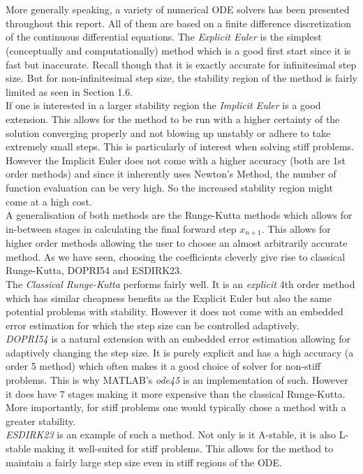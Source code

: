 

\\\

More generally speaking, a variety of numerical ODE solvers has been presented throughout this report. All of them are based on a finite difference discretization of the continuous differential equations. The \textit{Explicit Euler} is the simplest (conceptually and computationally) method which is a good first start since it is fast but inaccurate. Recall though that it is exactly accurate for infinitesimal step size. But for non-infinitesimal step size, the stability region of the method is fairly limited as seen in Section 1.6. \\
If one is interested in a larger stability region the \textit{Implicit Euler} is a good extension. This allows for the method to be run with a higher certainty of the solution converging properly and not blowing up unstably or adhere to take extremely small steps. This is particularly of interest when solving stiff problems. However the Implicit Euler does not come with a higher accuracy (both are 1st order methods) and since it inherently uses Newton's Method, the number of function evaluation can be very high. So the increased stability region might come at a high cost.
\\
A generalisation of both methods are the Runge-Kutta methods which allows for in-between stages in calculating the final forward step $x_{n+1}$. This allows for higher order methods allowing the user to choose an almost arbitrarily accurate method. As we have seen, choosing the coefficients cleverly give rise to classical Runge-Kutta, DOPRI54 and ESDIRK23.
\\
The \textit{Classical Runge-Kutta} performs fairly well. It is an \textit{explicit} 4th order method which has similar cheapness benefits as the Explicit Euler but also the same potential problems with stability. However it does not come with an embedded error estimation for which the step size can be controlled adaptively.\\
\textit{DOPRI54} is a natural extension with an embedded error estimation allowing for adaptively changing the step size. It is purely explicit and has a high accuracy (a order 5 method) which often makes it a good choice of solver for non-stiff problems. This is why MATLAB's \textit{ode45} is an implementation of such. However it does have 7 stages making it more expensive than the classical Runge-Kutta. More importantly, for stiff problems one would typically chose a method with a greater stability.\\
\textit{ESDIRK23} is an example of such a method. Not only is it A-stable, it is also L-stable making it well-suited for stiff problems. This allows for the method to maintain a fairly large step size even in stiff regions of the ODE. 

